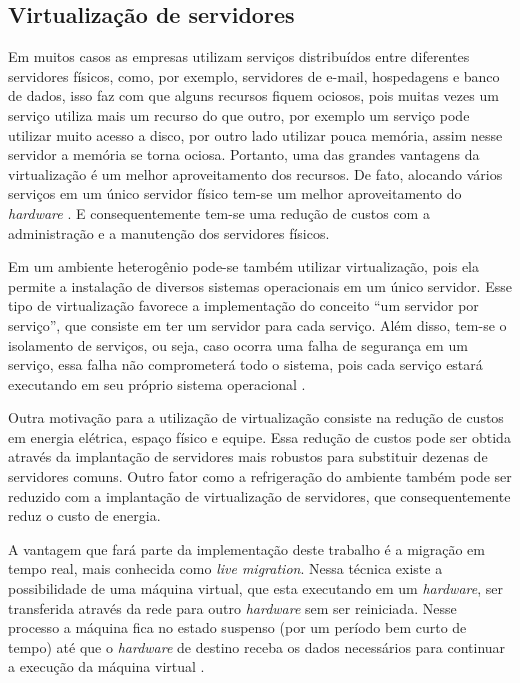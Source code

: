 \subsection{Virtualização de servidores}
\label{section:virtdesk}

Em muitos casos as empresas utilizam serviços distribuídos entre diferentes servidores físicos, como, por exemplo, servidores de e-mail, 
hospedagens e banco de dados, isso faz com que alguns recursos fiquem ociosos, pois muitas vezes um serviço utiliza mais um recurso do que outro,
por exemplo um serviço pode utilizar muito acesso a disco, por outro lado utilizar pouca memória, assim nesse servidor a memória se torna ociosa. 
Portanto, uma das grandes vantagens da virtualização é um melhor aproveitamento dos recursos. De fato, alocando vários serviços em um único 
servidor físico tem-se um melhor aproveitamento do \textit{hardware} \cite{moreira2006}. E consequentemente tem-se uma redução de custos com a 
administração e a manutenção dos servidores físicos.

Em um ambiente heterogênio pode-se também utilizar virtualização, pois ela permite a instalação de diversos sistemas operacionais em um 
único servidor. Esse tipo de virtualização favorece a implementação do conceito ``um servidor por serviço'', que consiste em ter um servidor 
para cada serviço. Além disso, tem-se o isolamento de serviços, ou seja, caso ocorra uma falha de segurança em um serviço, essa falha não 
comprometerá todo o sistema, pois cada serviço estará executando em seu próprio sistema operacional \cite{carissimi2008}.

Outra motivação para a utilização de virtualização consiste na redução de custos em energia elétrica, espaço físico e equipe. Essa redução de
custos pode ser obtida através da implantação de servidores mais robustos para substituir dezenas de servidores comuns. Outro fator como a
refrigeração do ambiente também pode ser reduzido com a implantação de virtualização de servidores, que consequentemente reduz o 
custo de energia.

A vantagem que fará parte da implementação deste trabalho é a migração em tempo real, mais conhecida como \textit{live migration}.
Nessa técnica existe a possibilidade de uma máquina virtual, que esta executando em um \textit{hardware}, ser transferida através da rede 
para outro \textit{hardware} sem ser reiniciada. Nesse processo a máquina fica no estado suspenso (por um período bem curto de tempo) até que
o \textit{hardware} de destino receba os dados necessários para continuar a execução da máquina virtual \cite{silva2009}.

